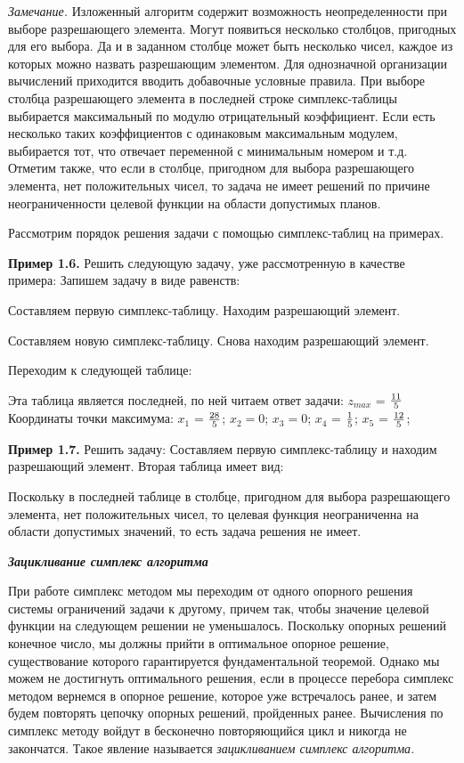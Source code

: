 \documentclass{article}
\begin{document}
\textit{Замечание.} Изложенный алгоритм содержит возможность неопределенности при выборе разрешающего элемента. Могут появиться несколько столбцов, пригодных для его выбора. Да и в заданном столбце может быть несколько чисел, каждое из которых можно назвать разрешающим элементом. Для однозначной организации вычислений приходится вводить добавочные условные правила. При выборе столбца разрешающего элемента в последней строке симплекс-таблицы выбирается максимальный по модулю отрицательный коэффициент. Если есть несколько таких коэффициентов с одинаковым максимальным модулем, выбирается тот, что отвечает переменной с минимальным номером и т.д. Отметим также, что если в столбце, пригодном для выбора разрешающего элемента, нет положительных чисел, то задача не имеет решений по причине неограниченности целевой функции на области допустимых планов.

Рассмотрим порядок решения задачи с помощью симплекс-таблиц на примерах.

\textbf{Пример 1.6.} Решить следующую задачу, уже рассмотренную в качестве примера:
Запишем задачу  в  виде равенств:

Составляем первую симплекс-таблицу. Находим разрешающий элемент.

Составляем новую симплекс-таблицу. Снова находим разрешающий элемент.

Переходим к следующей таблице:

Эта  таблица является последней, по ней читаем ответ задачи: $z_{max}$ = ${11}\over{5}$ Координаты точки максимума: $x_1$ = ${28}\over{5}$; $x_2 = 0$; $x_3 = 0$; $x_4$ = ${1}\over{5}$; $x_5$ = ${12}\over{5}$;

\textbf{Пример 1.7.} Решить задачу:
Составляем первую симплекс-таблицу и находим разрешающий элемент.
Вторая таблица имеет вид:

Поскольку в последней таблице в столбце, пригодном для выбора разрешающего элемента, нет положительных чисел, то целевая функция неограниченна на области допустимых значений, то есть задача решения не имеет.
\begin{center}
\textit{\textbf{Зацикливание симплекс алгоритма}}
\end{center}

При работе симплекс методом мы переходим от одного опорного решения системы ограничений задачи к другому, причем так, чтобы значение целевой функции на следующем решении не уменьшалось. Поскольку опорных решений конечное число, мы должны прийти в оптимальное опорное решение, существование которого гарантируется фундаментальной теоремой. Однако мы можем не достигнуть оптимального решения, если в процессе перебора симплекс методом вернемся в опорное решение, которое уже встречалось ранее, и затем будем повторять цепочку опорных решений, пройденных ранее. Вычисления по симплекс методу войдут в бесконечно повторяющийся цикл и никогда не закончатся. Такое явление называется \textit{зацикливанием симплекс алгоритма.}
\end{document}
